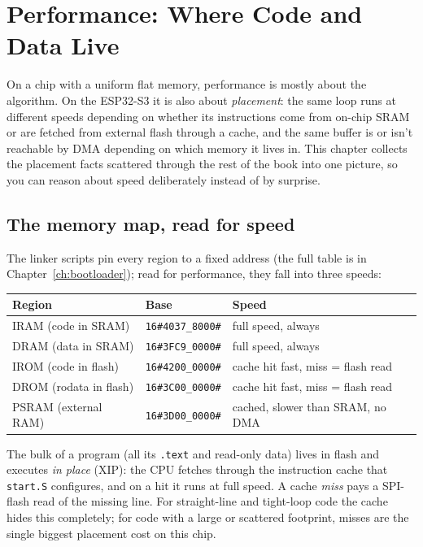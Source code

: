 \chapter{Performance: Where Code and Data Live}
\label{ch:perf}

On a chip with a uniform flat memory, performance is mostly about the algorithm. On
the ESP32-S3 it is also about \emph{placement}: the same loop runs at different
speeds depending on whether its instructions come from on-chip SRAM or are fetched
from external flash through a cache, and the same buffer is or isn't reachable by
DMA depending on which memory it lives in. This chapter collects the placement facts
scattered through the rest of the book into one picture, so you can reason about
speed deliberately instead of by surprise.

\section{The memory map, read for speed}

The linker scripts pin every region to a fixed address (the full table is in
Chapter~\ref{ch:bootloader}); read for performance, they fall into three speeds:

\begin{center}
\begin{tabular}{l l l}
\toprule
\textbf{Region} & \textbf{Base} & \textbf{Speed} \\ \midrule
IRAM (code in SRAM)   & \texttt{16\#4037\_8000\#} & full speed, always \\
DRAM (data in SRAM)   & \texttt{16\#3FC9\_0000\#} & full speed, always \\
IROM (code in flash)  & \texttt{16\#4200\_0000\#} & cache hit fast, miss = flash read \\
DROM (rodata in flash)& \texttt{16\#3C00\_0000\#} & cache hit fast, miss = flash read \\
PSRAM (external RAM)  & \texttt{16\#3D00\_0000\#} & cached, slower than SRAM, no DMA \\
\bottomrule
\end{tabular}
\end{center}

The bulk of a program (all its \texttt{.text} and read-only data) lives in
flash and executes \emph{in place} (XIP): the CPU fetches through the instruction
cache that \texttt{start.S} configures, and on a hit it runs at full speed. A cache
\emph{miss} pays a SPI-flash read of the missing line. For straight-line and
tight-loop code the cache hides this completely; for code with a large or scattered
footprint, misses are the single biggest placement cost on this chip.

